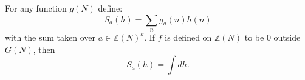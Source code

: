 For any function $g(N)$ define:
$$S_a(h) = \sum_{n} g_a(n) h(n)$$
with the sum taken over $a \in \mathbb{Z}(N)^k$. If $f$ is defined on $\mathbb{Z}(N)$ to be $0$ outside $G(N)$, then
$$S_a(h) = \int dh.$$
